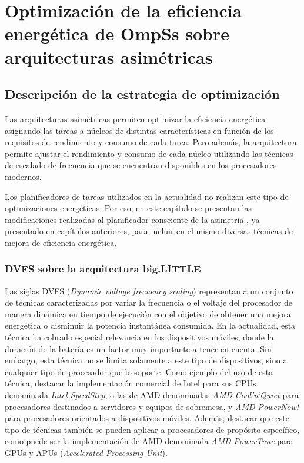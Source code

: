 \cleardoublepage

\chapter{Optimización de la eficiencia energética de OmpSs sobre arquitecturas asimétricas}
\label{ch:chapter5}

\section{Descripción de la estrategia de optimización}

Las arquitecturas asimétricas permiten optimizar la eficiencia energética
asignando las tareas a núcleos de distintas características en función de
los requisitos de rendimiento y consumo de cada tarea. Pero además, la
arquitectura permite ajustar el rendimiento y consumo de cada núcleo
utilizando las técnicas de escalado de frecuencia que se encuentran
disponibles en los procesadores modernos.

Los planificadores de tareas utilizados en la actualidad no realizan este
tipo de optimizaciones energéticas. Por eso, en este capítulo se presentan
las modificaciones realizadas al planificador consciente de la asimetría
\botlev, ya presentado en capítulos anteriores, para incluir en el mismo
diversas técnicas de mejora de eficiencia energética.


\subsection{DVFS sobre la arquitectura big.LITTLE}
\label{sec:DVFS_BIGLITTLE}
Las siglas DVFS (\emph{Dynamic voltage frecuency scaling}) representan a un
conjunto de técnicas caracterizadas por variar la frecuencia o el voltaje
del procesador de manera dinámica en tiempo de ejecución con el objetivo de
obtener una mejora energética o disminuir la potencia instantánea
consumida. En la actualidad, esta técnica ha cobrado especial relevancia en
los dispositivos móviles, donde la duración de la batería es un factor muy
importante a tener en cuenta. Sin embargo, esta técnica no se limita
solamente a este tipo de dispositivos, sino a cualquier tipo de procesador
que lo soporte. Como ejemplo del uso de esta técnica, destacar la
implementación comercial de Intel para sus CPUs denominada \emph{Intel
  SpeedStep}, o las de AMD denominadas \emph{AMD Cool'n'Quiet} para
procesadores destinados a servidores y equipos de sobremesa, y \emph{AMD
  PowerNow!}  para procesadores orientados a dispositivos móviles. Además,
destacar que este tipo de técnicas también se pueden aplicar a procesadores
de propósito específico, como puede ser la implementación de AMD denominada
\emph{AMD PowerTune} para GPUs y APUs (\emph{Accelerated Processing Unit}).

